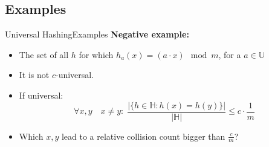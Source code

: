 \subsection{Examples}

\begin{frame}{Universal Hashing}{Examples}
  \textbf{Negative example:}
  \begin{itemize}
    \item<2->
      The set of all {\color{MainA}$h$} for which
      {\color{MainA}$h_a(x) = (a \cdot x) \mod m$, for a $a \in \mathbb{U}$}
    \item<3->
      It is not {\color{MainA}$c$}-universal. 
    \item<4->
      If universal:
      {\color{MainA}
      \begin{displaymath}
        \forall x, y \hspace{1em} x \neq y\!: \; \frac{
          \vert \{h \in \mathbb{H}: h(x) = h(y)\} \vert
        }{
          \vert \mathbb{H} \vert
        } \leq c \cdot \frac{1}{m}
       \end{displaymath}}
    \vspace{-1em}
    \item<5->
      Which {\color{MainA}$x, y$} lead to a relative collision count bigger than {\color{MainA}$\frac{c}{m}$}?
  \end{itemize}
\end{frame}


